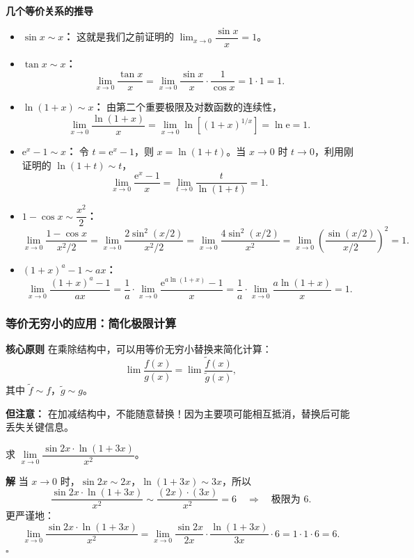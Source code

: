 \documentclass[fontset=fandol]{ctexart}
\newenvironment{custom}[1]{\par\noindent\textbf{#1}\quad}{\par\vspace{0.8em}}
\newenvironment{solution}{\par\noindent\textbf{解}\quad}{\hfill$\square$\par\vspace{0.8em}}
\newcommand{\ee}{\mathrm{e}}
\begin{document}
\begin{custom}{几个等价关系的推导}

\begin{itemize}
\item \textbf{\(\sin x \sim x\)：} 这就是我们之前证明的 \(\lim_{x \to 0} \dfrac{\sin x}{x} = 1\)。

\item \textbf{\(\tan x \sim x\)：} 
\[
\lim_{x \to 0} \dfrac{\tan x}{x} = \lim_{x \to 0} \dfrac{\sin x}{x} \cdot \dfrac{1}{\cos x} = 1 \cdot 1 = 1.
\]

\item \textbf{\(\ln(1+x)\sim x\)：} 由第二个重要极限及对数函数的连续性，
\[
\lim_{x\to0}\frac{\ln(1+x)}{x}
=\lim_{x\to0}\ln\!\left[(1+x)^{1/x}\right]
=\ln\ee=1.
\]

\item \textbf{\(\ee^x-1\sim x\)：} 令 \(t=\ee^x-1\)，则 \(x=\ln(1+t)\)。当 \(x\to0\) 时 \(t\to0\)，利用刚证明的 \(\ln(1+t)\sim t\)，
\[
\lim_{x\to0}\frac{\ee^x-1}{x}
=\lim_{t\to0}\frac{t}{\ln(1+t)}=1.
\]

\item \textbf{\(1 - \cos x \sim \dfrac{x^2}{2}\)：} 
\[
\lim_{x \to 0} \dfrac{1 - \cos x}{x^2/2} = \lim_{x \to 0} \dfrac{2 \sin^2(x/2)}{x^2/2} = \lim_{x \to 0} \dfrac{4 \sin^2(x/2)}{x^2} = \lim_{x \to 0} \left(\dfrac{\sin(x/2)}{x/2}\right)^2 = 1.
\]

\item \textbf{\((1+x)^a - 1 \sim ax\)：} 
\[
\lim_{x \to 0} \dfrac{(1+x)^a - 1}{ax} = \dfrac{1}{a} \cdot \lim_{x \to 0} \dfrac{\ee^{a\ln(1+x)} - 1}{x} = \dfrac{1}{a} \cdot \lim_{x \to 0} \dfrac{a\ln(1+x)}{x} = 1.
\]
\end{itemize}
\end{custom}

\subsubsection{等价无穷小的应用：简化极限计算}

\begin{custom}{核心原则}
在乘除结构中，可以用等价无穷小替换来简化计算：
\[
\lim \dfrac{f(x)}{g(x)} = \lim \dfrac{\tilde{f}(x)}{\tilde{g}(x)},
\]
其中 \(\tilde{f} \sim f\)，\(\tilde{g} \sim g\)。

\textbf{但注意：} 在加减结构中，不能随意替换！因为主要项可能相互抵消，替换后可能丢失关键信息。
\end{custom}

\begin{example}[乘除结构中的替换]
求 \(\lim\limits_{x \to 0} \dfrac{\sin 2x \cdot \ln(1+3x)}{x^2}\)。
\end{example}
\begin{solution}
当 \(x \to 0\) 时，\(\sin 2x \sim 2x\)，\(\ln(1+3x) \sim 3x\)，所以
\[
\dfrac{\sin 2x \cdot \ln(1+3x)}{x^2} \sim \dfrac{(2x) \cdot (3x)}{x^2} = 6 \quad \Rightarrow \quad \text{极限为 } 6.
\]
更严谨地：
\[
\lim_{x \to 0} \dfrac{\sin 2x \cdot \ln(1+3x)}{x^2} = \lim_{x \to 0} \dfrac{\sin 2x}{2x} \cdot \dfrac{\ln(1+3x)}{3x} \cdot 6 = 1 \cdot 1 \cdot 6 = 6.
\]
\end{solution}
\end{document}
